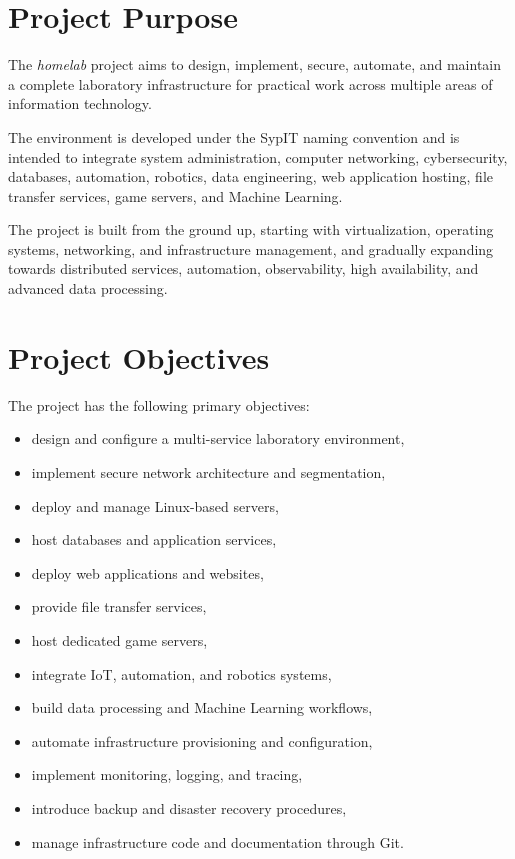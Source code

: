 \section{Project Purpose}

The \textit{homelab} project aims to design, implement, secure, automate,
and maintain a complete laboratory infrastructure for practical work
across multiple areas of information technology.

The environment is developed under the SypIT naming convention and is intended
to integrate system administration, computer networking, cybersecurity,
databases, automation, robotics, data engineering, web application hosting,
file transfer services, game servers, and Machine Learning.

The project is built from the ground up, starting with virtualization,
operating systems, networking, and infrastructure management, and gradually
expanding towards distributed services, automation, observability,
high availability, and advanced data processing.

\section{Project Objectives}

The project has the following primary objectives:

\begin{itemize}
    \item design and configure a multi-service laboratory environment,
    \item implement secure network architecture and segmentation,
    \item deploy and manage Linux-based servers,
    \item host databases and application services,
    \item deploy web applications and websites,
    \item provide file transfer services,
    \item host dedicated game servers,
    \item integrate IoT, automation, and robotics systems,
    \item build data processing and Machine Learning workflows,
    \item automate infrastructure provisioning and configuration,
    \item implement monitoring, logging, and tracing,
    \item introduce backup and disaster recovery procedures,
    \item manage infrastructure code and documentation through Git.
\end{itemize}

